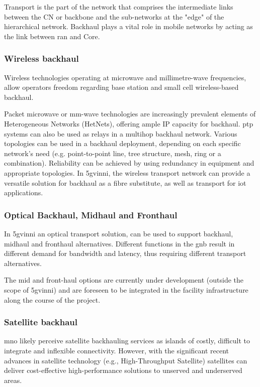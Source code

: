     Transport is the part of the network that comprises the intermediate links between the CN or backbone and the sub-networks at the "edge" of the hierarchical network. Backhaul plays a vital role in mobile networks by acting as the link between \acrshort{ran} and Core.

        \subsubsection{Wireless backhaul}
        Wireless technologies operating at microwave and millimetre-wave frequencies, allow operators freedom regarding base station and small cell wireless-based backhaul. 
        
        Packet microwave or mm-wave technologies are increasingly prevalent elements of Heterogeneous Networks (HetNets), offering ample IP capacity for backhaul. \acrfull{ptp} systems can also be used as relays in a multihop backhaul network. Various topologies can be used in a backhaul deployment, depending on each specific network’s need (e.g. point-to-point line, tree structure, mesh, ring or a combination). Reliability can be achieved by using redundancy in equipment and appropriate topologies.
        In \acrshort{5gvinni}, the wireless transport network can provide a versatile solution for backhaul as a fibre substitute, as well as transport for \acrshort{iot} applications. 
        
        \subsubsection{Optical Backhaul, Midhaul and Fronthaul}
        In \acrshort{5gvinni} an optical transport solution, can be used to support backhaul, midhaul and fronthaul alternatives. Different functions in the \acrshort{gnb} result in different demand for bandwidth and latency, thus requiring different transport alternatives.

       The mid and front-haul options are currently under development (outside the scope of \acrshort{5gvinni}) and are foreseen to be integrated in the facility infrastructure along the course of the project.

        \subsubsection{Satellite backhaul}
        \acrfull{mno} likely perceive satellite backhauling services as islands of costly, difficult to integrate and inflexible connectivity. However, with the significant recent advances in satellite technology (e.g., High-Throughput Satellite) satellites can deliver cost-effective high-performance solutions to unserved and underserved areas.
        
